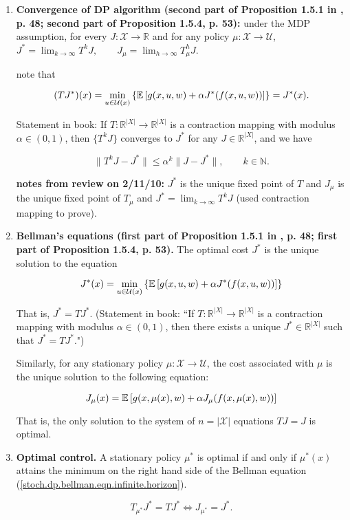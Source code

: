 \begin{enumerate}

\item \textbf{Convergence of DP algorithm (second part of Proposition 1.5.1 in \citet{v2_bertsekas2012dynamic}, p. 48; second part of Proposition 1.5.4, p. 53):} under the MDP assumption, for every \(J : \mathcal{X} \to \mathbb{R}\) and for any policy \(\mu: \mathcal{X} \to \mathcal{U}\), \(J^* = \lim_{k \to \infty} T^kJ, \qquad J_\mu = \lim_{h \to \infty} T_\mu^h J\).

note that

\[
(TJ^*)(x) = \min_{u \in \mathcal{U}(x)} \left\{ \mathbb{E} \left[ g(x,u,w) + \alpha J^*(f(x,u,w)) \right] \right\} = J^*(x).
\]

Statement in book: If \(T: \mathbb{R}^{|X|} \to \mathbb{R}^{|X|}\) is a contraction mapping with modulus \(\alpha \in (0,1)\), then \(\{T^k J\}\) converges to \(J^*\) for any \(J \in \mathbb{R}^{|X|}\), and we have

\[
\lVert T^k J - J^* \rVert \leq \alpha^k \lVert J - J^* \rVert, \qquad k \in \mathbb{N}.
\]

\textbf{notes from review on 2/11/10:} \(J^*\) is the unique fixed point of \(T\) and \(J_\mu\) is the unique fixed point of \(T_\mu\) and \(J^* = \lim_{k \to \infty} T^k J\) (used contraction mapping to prove).

\item \textbf{Bellman's equations (first part of Proposition 1.5.1 in \citet{v2_bertsekas2012dynamic}, p. 48; first part of Proposition 1.5.4, p. 53).} The optimal cost \(J^*\) is the unique solution to the equation

\begin{equation}\label{stoch.dp.bellman.eqn.infinite.horizon}
J^*(x) = \min_{u \in \mathcal{U}(x)} \left\{ \mathbb{E} \left[ g(x,u,w) + \alpha J^*(f(x,u,w)) \right]\right\}
\end{equation}

That is, \(J^* = T J^*\). (Statement in book: ``If \(T: \mathbb{R}^{|X|} \to \mathbb{R}^{|X|}\) is a contraction mapping with modulus \(\alpha \in (0,1)\), then there exists a unique \(J^* \in \mathbb{R}^{|X|}\) such that \(J^* = TJ^*\).")

Similarly, for any stationary policy \(\mu: \mathcal{X} \to \mathcal{U}\), the cost associated with \(\mu\) is the unique solution to the following equation:

\[
J_\mu(x) = \mathbb{E}\left[  g(x,\mu(x),w) + \alpha J_\mu(f(x,\mu(x) ,w)) \right]
\]

That is, the only solution to the system of \(n = | \mathcal{X}|\) equations \(TJ = J\) is optimal.


\item \textbf{Optimal control.} A stationary policy \(\mu^*\) is optimal if and only if \(\mu^*(x)\) attains the minimum on the right hand side of the Bellman equation (\ref{stoch.dp.bellman.eqn.infinite.horizon}). 

\[
T_{\mu^*} J^* = T J^* \iff J_{\mu^*} = J^*.
\]

\end{enumerate}


